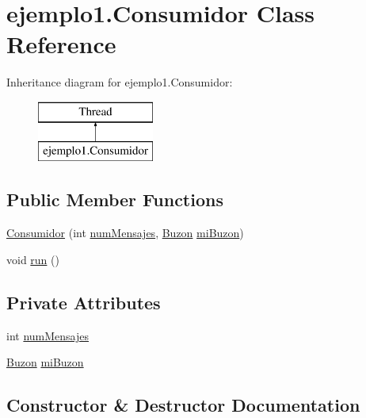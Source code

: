 \hypertarget{classejemplo1_1_1_consumidor}{}\section{ejemplo1.\+Consumidor Class Reference}
\label{classejemplo1_1_1_consumidor}
Inheritance diagram for ejemplo1.\+Consumidor\+:\begin{figure}[H]
\begin{center}
\leavevmode
\includegraphics[height=2.000000cm]{classejemplo1_1_1_consumidor}
\end{center}
\end{figure}
\subsection*{Public Member Functions}
\begin{DoxyCompactItemize}
\item 
\mbox{\hyperlink{classejemplo1_1_1_consumidor_a154b58728e8047da873a91733fe07bfc}{Consumidor}} (int \mbox{\hyperlink{classejemplo1_1_1_consumidor_a63ff895e6df26250998a4f92ce1ec6ef}{num\+Mensajes}}, \mbox{\hyperlink{classejemplo1_1_1_buzon}{Buzon}} \mbox{\hyperlink{classejemplo1_1_1_consumidor_acf30410cc121fa5cdca21e474da6ef99}{mi\+Buzon}})
\item 
void \mbox{\hyperlink{classejemplo1_1_1_consumidor_a4f9b27a19f8517a2f3983610ef61a26f}{run}} ()
\end{DoxyCompactItemize}
\subsection*{Private Attributes}
\begin{DoxyCompactItemize}
\item 
int \mbox{\hyperlink{classejemplo1_1_1_consumidor_a63ff895e6df26250998a4f92ce1ec6ef}{num\+Mensajes}}
\item 
\mbox{\hyperlink{classejemplo1_1_1_buzon}{Buzon}} \mbox{\hyperlink{classejemplo1_1_1_consumidor_acf30410cc121fa5cdca21e474da6ef99}{mi\+Buzon}}
\end{DoxyCompactItemize}


\subsection{Constructor \& Destructor Documentation}
\mbox{\label{classejemplo1_1_1_consumidor_a154b58728e8047da873a91733fe07bfc}} 
